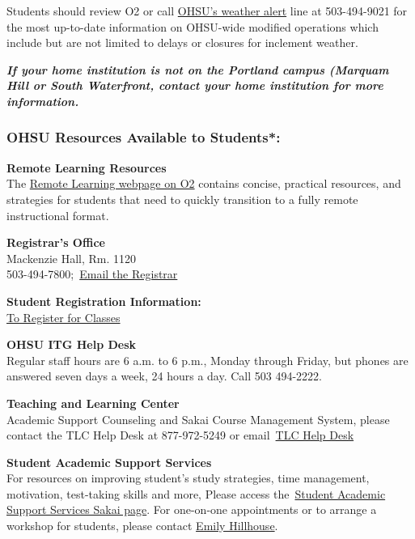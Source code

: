 \documentclass[
  letterpaper,
  DIV=11,
  numbers=noendperiod]{scrartcl}
\begin{document}
Students should review O2 or call
\href{https://www.ohsu.edu/xd/about/visiting/weather/}{OHSU's weather
alert} line at 503-494-9021 for the most up-to-date information on
OHSU-wide modified operations which include but are not limited to
delays or closures for inclement weather.

\textbf{\emph{If your home institution is not on the Portland campus
(Marquam Hill or South Waterfront, contact your home institution for
more information.}}

\hypertarget{ohsu-resources-available-to-students}{%
\subsubsection{OHSU Resources Available to
Students*:}\label{ohsu-resources-available-to-students}}

\textbf{Remote Learning Resources\\
}The
\href{https://o2.ohsu.edu/student-central/transforming-learning.cfm}{Remote
Learning webpage on O2} contains concise, practical resources, and
strategies for students that need to quickly transition to a fully
remote instructional format.

\textbf{Registrar's Office}\\
Mackenzie Hall, Rm. 1120\\
503-494-7800;~\href{mailto:regohsu@ohsu.edu}{Email the Registrar}

\textbf{Student Registration Information:}~\\
\href{http://www.ohsu.edu/xd/education/student-services/registrar/registration-information/index.cfm}{To
Register for Classes}

\textbf{OHSU ITG Help Desk}\\
Regular staff hours are 6 a.m. to 6 p.m., Monday through Friday, but
phones are answered seven days a week, 24 hours a day. Call 503
494-2222.

\textbf{Teaching and Learning Center}\\
Academic Support Counseling and Sakai Course Management System, please
contact the TLC Help Desk at 877-972-5249 or
email~\href{mailto:sakai@ohsu.edu}{TLC Help Desk}

\textbf{Student Academic Support Services\\
}For resources on improving student's study strategies, time management,
motivation, test-taking skills and more, Please access
the~\href{https://sakai.ohsu.edu/portal/site/Student_Support}{Student
Academic Support Services Sakai page}. For one-on-one appointments or to
arrange a workshop for students, please contact
\href{mailto:learningsupport@ohsu.edu}{Emily Hillhouse}.
\end{document}

